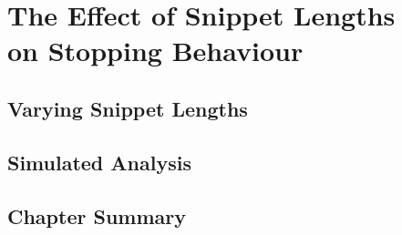 
\chapter[The Effects of Snippet Lengths on Stopping Behaviour]{The Effect of Snippet Lengths\\on Stopping Behaviour}\label{chap:snippets}

\section{Varying Snippet Lengths}

\section{Simulated Analysis}

\section{Chapter Summary}